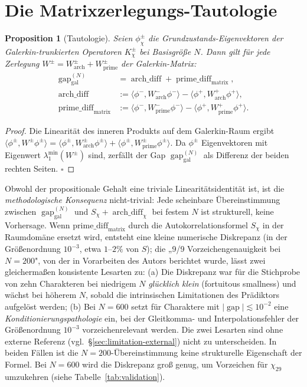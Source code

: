 \documentclass[10pt,twocolumn]{article}
\newtheorem{proposition}[theorem]{Proposition}
\theoremstyle{definition}
\theoremstyle{remark}
\newcommand{\gap}{\operatorname{gap}}
\newcommand{\chifn}{\chi}
\newcommand{\archdiff}{\operatorname{arch\_diff}}
\newcommand{\primediff}{\operatorname{prime\_diff}_{\mathrm{matrix}}}
\begin{document}
\section{Die Matrixzerlegungs-Tautologie}
\label{sec:tautology}

\begin{proposition}[Tautologie]
\label{prop:tautology}
Seien $\phi^\pm_{\chifn}$ die Grundzustands-Eigenvektoren der Galerkin-trunkierten
Operatoren $K^\pm_{\chifn}$ bei Basisgröße $N$. Dann gilt für jede Zerlegung
$W^\pm = W^\pm_{\mathrm{arch}} + W^\pm_{\mathrm{prime}}$ der Galerkin-Matrix:
\[
\begin{aligned}
  \gap_{\mathrm{gal}}^{(N)}
    &= \archdiff + \primediff,\\
  \archdiff
    &:= \langle\phi^-, W^-_{\mathrm{arch}}\phi^-\rangle
      - \langle\phi^+, W^+_{\mathrm{arch}}\phi^+\rangle,\\
  \primediff
    &:= \langle\phi^-, W^-_{\mathrm{prime}}\phi^-\rangle
      - \langle\phi^+, W^+_{\mathrm{prime}}\phi^+\rangle.
\end{aligned}
\]
\end{proposition}

\begin{proof}
Die Linearität des inneren Produkts auf dem Galerkin-Raum ergibt
$\langle\phi^\pm, W^\pm\phi^\pm\rangle = \langle\phi^\pm,
W^\pm_{\mathrm{arch}}\phi^\pm\rangle + \langle\phi^\pm,
W^\pm_{\mathrm{prime}}\phi^\pm\rangle$.
Da $\phi^\pm$ Eigenvektoren mit Eigenwert $\lambda_1^{\min}(W^\pm)$ sind,
zerfällt der Gap $\gap_{\mathrm{gal}}^{(N)}$ als Differenz der beiden rechten
Seiten. $\square$
\end{proof}

Obwohl der propositionale Gehalt eine triviale Linearitätsidentität ist, ist
die \emph{methodologische Konsequenz} nicht-trivial: Jede scheinbare
Übereinstimmung zwischen $\gap_{\mathrm{gal}}^{(N)}$ und $S_\chi+\archdiff_\chi$
bei festem $N$ ist strukturell, keine Vorhersage. Wenn
$\mathrm{prime\_diff}_{\mathrm{matrix}}$ durch die Autokorrelationsformel
$S_{\chifn}$ in der Raumdomäne ersetzt wird, entsteht eine kleine numerische Diskrepanz
(in der Größenordnung $10^{-3}$, etwa $1$--$2\%$ von $S$); die „9/9 Vorzeichengenauigkeit bei
$N=200$", von der in Vorarbeiten des Autors berichtet wurde, lässt zwei
gleichermaßen konsistente Lesarten zu: (a) Die Diskrepanz war für die
Stichprobe von zehn Charakteren bei niedrigem $N$ \emph{glücklich klein}
(fortuitous smallness) und wächst bei höherem $N$, sobald die intrinsischen
Limitationen des Prädiktors aufgelöst werden; (b) Bei $N=600$ setzt für
Charaktere mit $|\gap|\lesssim 10^{-2}$ eine
\emph{Konditionierungspathologie} ein, bei der Gleitkomma- und
Interpolationsfehler der Größenordnung $10^{-3}$ vorzeichenrelevant
werden. Die zwei Lesarten sind ohne externe Referenz
(vgl.\ \S\ref{sec:limitation-external}) nicht zu unterscheiden. In
beiden Fällen ist die $N=200$-Übereinstimmung keine strukturelle
Eigenschaft der Formel. Bei $N=600$ wird die Diskrepanz groß genug,
um Vorzeichen für $\chifn_{29}$ umzukehren (siehe Tabelle~\ref{tab:validation}).
\end{document}
